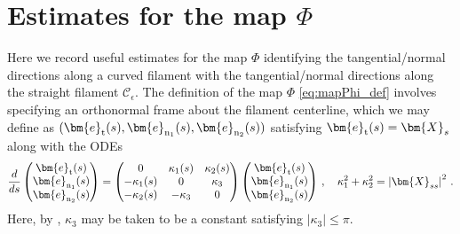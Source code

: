 \documentclass[11pt,reqno]{amsart}
\newcommand{\X}{\bm{X}}
\newcommand{\be}{\bm{e}}
\newcommand{\abs}[1]{\left\lvert #1 \right\rvert}
\newcommand{\mc}[1]{\mathcal{#1}}
\theoremstyle{definition}
\begin{document}
\appendix
\section{Estimates for the map $\Phi$}\label{sec:Phi_comm}
Here we record useful estimates for the map $\Phi$ identifying the tangential/normal directions along a curved filament with the tangential/normal directions along the straight filament $\mc{C}_\epsilon$. The definition of the map $\Phi$ \eqref{eq:mapPhi_def} involves specifying an orthonormal frame about the filament centerline, which we may define as $(\be_{\rm t}(s),\be_{\rm n_1}(s),\be_{\rm n_2}(s))$ satisfying $\be_{\rm t}(s)=\X_s$ along with the ODEs
\begin{equation}\label{eq:frame}
\frac{d}{ds}
\begin{pmatrix}
\be_{\rm t}(s)\\
\be_{\rm n_1}(s)\\
\be_{\rm n_2}(s)
\end{pmatrix}
 = \begin{pmatrix}
 0 & \kappa_1(s) & \kappa_2(s) \\
 -\kappa_1(s) & 0 & \kappa_3 \\
-\kappa_2(s) & -\kappa_3& 0
 \end{pmatrix}\begin{pmatrix}
\be_{\rm t}(s)\\
\be_{\rm n_1}(s)\\
\be_{\rm n_2}(s)
\end{pmatrix}\,, \quad 
\kappa_1^2+\kappa_2^2=\abs{\X_{ss}}^2\,.
\end{equation}
Here, by \cite[Lemma 1.1]{closed_loop}, $\kappa_3$ may be taken to be a constant satisfying $\abs{\kappa_3}\le \pi$.
\end{document}
